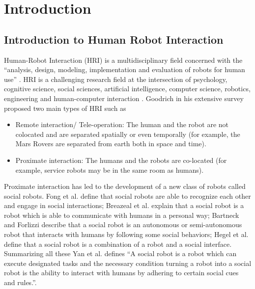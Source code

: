 
\chapter{Introduction} %

\label{Chapter1} %



\section{Introduction to Human Robot Interaction}
	Human-Robot Interaction (HRI) is a multidisciplinary field concerned with the ``analysis, design, modeling, implementation and evaluation of robots for human use'' \cite{fong2003collaboration}. HRI is a challenging research field at the intersection of psychology, cognitive science, social sciences, artificial intelligence, computer science, robotics, engineering and human-computer interaction \cite{dautenhahn2007methodology}. Goodrich \cite{goodrich2007human} in his extensive survey proposed two main types of HRI such as
\begin{itemize}
\item Remote interaction/ Tele-operation: The human and the robot are not colocated and are separated spatially or even temporally (for example, the Mars Rovers are separated from earth both in space and time). 
\item Proximate interaction: The humans and the robots are co-located (for example, service robots may be in the same room as humans).
\end{itemize}
	Proximate interaction has led to the development of a new class of robots called social robots. Fong et al. \cite{fong2003survey} define that social robots are able to recognize each other and engage in social interactions; Breazeal et al. \cite{Breazeal:2002:DSR:515422} explain that a social robot is a robot which is able to communicate with humans in a personal way; Bartneck and Forlizzi \cite{bartneck2004design} describe that a social robot is an autonomous or semi-autonomous robot that interacts with humans by following some social behaviors; Hegel et al. \cite{hegel2009understanding} define that a social robot is a combination of a robot and a social interface. Summarizing all these Yan et al. \cite{yan2014survey} defines ``A social robot is a robot which can execute designated tasks and the necessary condition turning a robot into a social robot is the ability to interact with humans by adhering to certain social cues and rules.''. 
	
